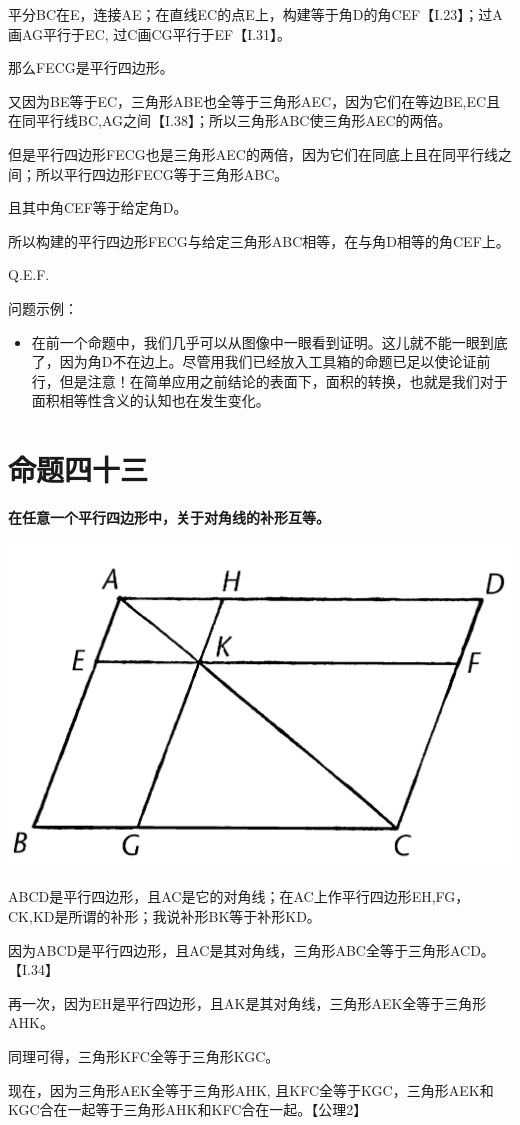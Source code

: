 \documentclass[
]{book}
\providecommand{\tightlist}{%
  \setlength{\itemsep}{0pt}\setlength{\parskip}{0pt}}
\begin{document}
平分BC在E，连接AE；在直线EC的点E上，构建等于角D的角CEF【I.23】；过A画AG平行于EC, 过C画CG平行于EF【I.31】。

那么FECG是平行四边形。

又因为BE等于EC，三角形ABE也全等于三角形AEC，因为它们在等边BE,EC且在同平行线BC,AG之间【I.38】；所以三角形ABC使三角形AEC的两倍。

但是平行四边形FECG也是三角形AEC的两倍，因为它们在同底上且在同平行线之间；所以平行四边形FECG等于三角形ABC。

且其中角CEF等于给定角D。

所以构建的平行四边形FECG与给定三角形ABC相等，在与角D相等的角CEF上。

Q.E.F.

问题示例：

\begin{itemize}
\tightlist
\item
  在前一个命题中，我们几乎可以从图像中一眼看到证明。这儿就不能一眼到底了，因为角D不在边上。尽管用我们已经放入工具箱的命题已足以使论证前行，但是注意！在简单应用之前结论的表面下，面积的转换，也就是我们对于面积相等性含义的认知也在发生变化。
\end{itemize}

\hypertarget{ux547dux9898ux56dbux5341ux4e09}{%
\section{命题四十三}\label{ux547dux9898ux56dbux5341ux4e09}}

\textbf{在任意一个平行四边形中，关于对角线的补形互等。}

\includegraphics[width=0.3\linewidth]{./image/img544}

ABCD是平行四边形，且AC是它的对角线；在AC上作平行四边形EH,FG，CK,KD是所谓的补形；我说补形BK等于补形KD。

因为ABCD是平行四边形，且AC是其对角线，三角形ABC全等于三角形ACD。【I.34】

再一次，因为EH是平行四边形，且AK是其对角线，三角形AEK全等于三角形AHK。

同理可得，三角形KFC全等于三角形KGC。

现在，因为三角形AEK全等于三角形AHK, 且KFC全等于KGC，三角形AEK和KGC合在一起等于三角形AHK和KFC合在一起。【公理2】
\end{document}
